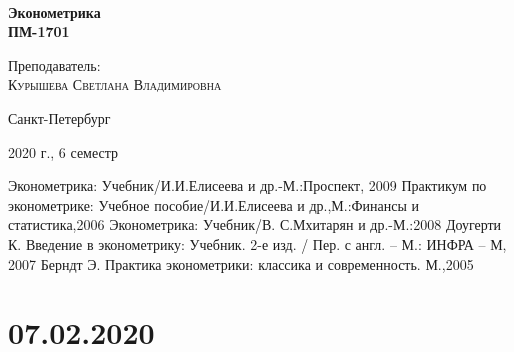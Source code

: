 \documentclass[aps,%
12pt,%
final,%
oneside,
onecolumn,%
musixtex, %
superscriptaddress,%
centertags]{article} %
\begin{document}
\begin{titlepage} 
\begin{center}
 
\textbf{}\\[10.0cm]
\textbf{\LARGE Эконометрика}\\[0.5cm]
\textbf{\Large ПМ-1701} \\[0.1cm]

\begin{center} \large
{Преподаватель:} \\[0.5cm]
\textsc {Курышева Светлана Владимировна }\\
\end{center}
\vfill 

{\large {Санкт-Петербург}} \par
{\large {2020 г., 6 семестр}}
\end{center} 
\end{titlepage}

\begin{thebibliography}{3}
Эконометрика: Учебник/И.И.Елисеева и др.-М.:Проспект, 2009
Практикум по эконометрике: Учебное пособие/И.И.Елисеева и др.,М.:Финансы и статистика,2006 
Эконометрика: Учебник/В. С.Мхитарян и др.-М.:2008
Доугерти К. Введение в эконометрику: Учебник. 2-е изд. / Пер. с англ. – М.: ИНФРА – М, 2007
Берндт Э. Практика эконометрики: классика и современность. М.,2005
\end{thebibliography}
\tableofcontents
\newpage
\section{07.02.2020}
\end{document}

